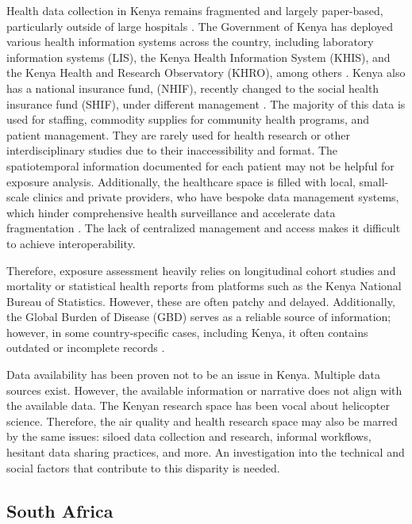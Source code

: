 \documentclass{article}
\begin{document}
Health data collection in Kenya remains fragmented and largely paper-based, particularly outside of large hospitals \cite{karuri_dhis2_2014}. The Government of Kenya has deployed various health information systems across the country, including laboratory information systems (LIS), the Kenya Health Information System (KHIS), and the Kenya Health and Research Observatory (KHRO), among others \cite{yetu_electronic_nodate}. Kenya also has a national insurance fund, (NHIF), recently changed to the social health insurance fund (SHIF), under different management \cite{barasa_kenya_2018}. The majority of this data is used for staffing, commodity supplies for community health programs, and patient management. They are rarely used for health research or other interdisciplinary studies due to their inaccessibility and format. The spatiotemporal information documented for each patient may not be helpful for exposure analysis. Additionally, the healthcare space is filled with local, small-scale clinics and private providers, who have bespoke data management systems, which hinder comprehensive health surveillance and accelerate data fragmentation \cite{mwangi_accessibility_2014}. The lack of centralized management and access makes it difficult to achieve interoperability.

Therefore, exposure assessment heavily relies on longitudinal cohort studies and mortality or statistical health reports from platforms such as the Kenya National Bureau of Statistics. However, these are often patchy and delayed. Additionally, the Global Burden of Disease (GBD) serves as a reliable source of information; however, in some country-specific cases, including Kenya, it often contains outdated or incomplete records \cite{noauthor_global_nodate}. 

Data availability has been proven not to be an issue in Kenya. Multiple data sources exist. However, the available information or narrative does not align with the available data. The Kenyan research space has been vocal about helicopter science. Therefore, the air quality and health research space may also be marred by the same issues: siloed data collection and research, informal workflows, hesitant data sharing practices, and more. An investigation into the technical and social factors that contribute to this disparity is needed.    
 

\subsection{South Africa}
\end{document}
